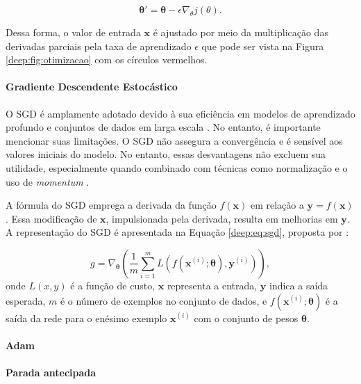 \begin{equation}
    \label{deep:eq:graddesc}
    \boldsymbol{\theta}' = \boldsymbol{\theta} - \epsilon \nabla_{\boldsymbol{}{\theta}} j(\boldsymbol{}{\theta}).
\end{equation}

Dessa forma, o valor de entrada $\boldsymbol{x}$ é ajustado por meio da multiplicação das derivadas parciais pela taxa de aprendizado $\epsilon$ que pode ser vista na Figura \ref{deep:fig:otimizacao} com os círculos vermelhos.

\paragraph{Gradiente Descendente Estocástico}
\label{deep:optimization:sgd}
O SGD é amplamente adotado devido à sua eficiência em modelos de aprendizado profundo e conjuntos de dados em larga escala \citep{Goodfellow2016}. No entanto, é importante mencionar suas limitações. O SGD não assegura a convergência e é sensível aos valores iniciais do modelo. No entanto, essas desvantagens não excluem sua utilidade, especialmente quando combinado com técnicas como normalização e o uso de \textit{momentum} \cite{Goodfellow2016}.

A fórmula do SGD emprega a derivada da função $f(\boldsymbol{x})$ em relação a $\boldsymbol{y} = f(\boldsymbol{x})$. Essa modificação de $\boldsymbol{x}$, impulsionada pela derivada, resulta em melhorias em $\boldsymbol{y}$. A representação do SGD é apresentada na Equação \ref{deep:eq:sgd}, proposta por \cite{Goodfellow2016}:

\begin{equation}
\label{deep:eq:sgd}
g = \nabla_{\boldsymbol{\theta}} \left(\frac{1}{m} \sum\limits_{i=1}^{m}L(f(\boldsymbol{x}^{(i)}; \boldsymbol{\theta}), \mathbf{y}^{(i)})\right),
\end{equation}
onde $L(x,y)$ é a função de custo, $\boldsymbol{x}$ representa a entrada, $\boldsymbol{y}$ indica a saída esperada, $m$ é o número de exemplos no conjunto de dados, e $f(\boldsymbol{x}^{(i)}; \boldsymbol{\theta})$ é a saída da rede para o enésimo exemplo $\boldsymbol{x}^{(i)}$ com o conjunto de pesos $\boldsymbol{\theta}$.

\paragraph{Adam}
\label{deep:eq:adam}


\paragraph{Parada antecipada}
\label{deep:optimization:early_stoping}

